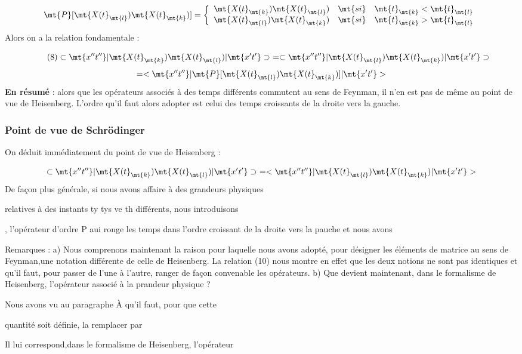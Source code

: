 \[
\mt{P}[\mt{ X(t}_\mt{l}) \mt{X(t}_\mt{k})] = 
\left\{
  \begin{array}{rcr}
    \mt{X(t}_\mt{k}) \mt{ X(t}_\mt{l}) & \mt{si} & \mt{t}_\mt{k} < \mt{t}_\mt{l} \\
    \mt{X(t}_\mt{l}) \mt{ X(t}_\mt{k}) & \mt{si} & \mt{t}_\mt{k} > \mt{t}_\mt{l} \\
  \end{array}
\right.\]
Alors on a la relation fondamentale :

\[
\tag{8}\subset \mt{x''t''} | \mt{X(t}_\mt{k}) \mt{ X(t}_\mt{l}) | \mt{x't'}\supset\ =
\subset \mt{x''t''} | \mt{ X(t}_\mt{l}) \mt{X(t}_\mt{k}) | \mt{x't'}\supset\
\]
\[
 = < \mt{x''t''} | \mt{P}[\mt{ X(t}_\mt{l}) \mt{X(t}_\mt{k})] | \mt{x't'} >
\]
{\bf En résumé} : alors que les opérateurs associés à des temps différents commutent au sens de Feynman, il n'en est pas de même au point de vue de Heisenberg.
L'ordre qu'il faut alors adopter est celui des temps croissants de la droite
vers la gauche.
\subsubsection{Point de vue de Schrödinger}%
On déduit immédiatement du point de vue de Heisenberg :

\[
\subset \mt{x''t''} | \mt{X(t}_\mt{k}) \mt{ X(t}_\mt{l}) | \mt{x't'}\supset\ =
< \mt{x''t''} | \mt{ X(t}_\mt{l}) \mt{X(t}_\mt{k}) | \mt{x't'} >
\]
De façon plus générale, si nous avons affaire à des grandeurs physiques

relatives à des instants ty tys ve th différents, nous introduisons

,
l'opérateur d'ordre P aui ronge les temps dans l'ordre croissant de la
droite vers la pauche et nous avons


Remarques :
a) Nous comprenons maintenant la raison pour laquelle nous avons adopté,
pour désigner les éléments de matrice au sens de Feynman,une notation différente de celle de Heisenberg. La relation (10) nous montre en effet que
les deux notions ne sont pas identiques et qu'il faut, pour passer de l'une
à l'autre, ranger de façon convenable les opérateurs.
b) Que devient maintenant, dans le formalisme de Heisenberg, l'opérateur
associé à la prandeur physique  ?

Nous avons vu au paragraphe À qu'il faut, pour que cette

quantité soit définie, la remplacer par

Il lui correspond,dans le formalisme de Heisenberg, l'opérateur


